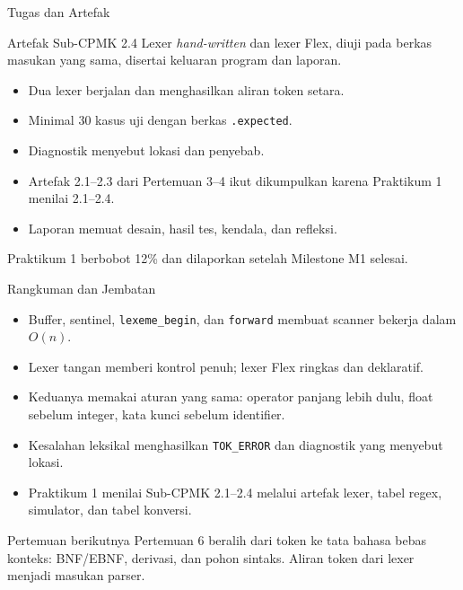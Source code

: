 \documentclass[aspectratio=169,10pt,t]{beamer}
\begin{document}
\begin{frame}{Tugas dan Artefak}
  \begin{block}{Artefak Sub-CPMK 2.4}
    Lexer \textit{hand-written} dan lexer Flex, diuji pada berkas
    masukan yang sama, disertai keluaran program dan laporan.
  \end{block}

  \small
  \begin{itemize}
    \item Dua lexer berjalan dan menghasilkan aliran token setara.
    \item Minimal 30 kasus uji dengan berkas \texttt{.expected}.
    \item Diagnostik menyebut lokasi dan penyebab.
    \item Artefak 2.1--2.3 dari Pertemuan 3--4 ikut dikumpulkan karena
          Praktikum 1 menilai 2.1--2.4.
    \item Laporan memuat desain, hasil tes, kendala, dan refleksi.
  \end{itemize}

  \vspace{3pt}
  {\footnotesize\color{ubbblue!75}Praktikum 1 berbobot 12\% dan
  dilaporkan setelah Milestone M1 selesai.}
\end{frame}

\begin{frame}{Rangkuman dan Jembatan}
  \begin{itemize}
    \item Buffer, sentinel, \texttt{lexeme\_begin}, dan \texttt{forward}
          membuat scanner bekerja dalam \(O(n)\).
    \item Lexer tangan memberi kontrol penuh; lexer Flex ringkas dan
          deklaratif.
    \item Keduanya memakai aturan yang sama: operator panjang lebih
          dulu, float sebelum integer, kata kunci sebelum identifier.
    \item Kesalahan leksikal menghasilkan \texttt{TOK\_ERROR} dan
          diagnostik yang menyebut lokasi.
    \item Praktikum 1 menilai Sub-CPMK 2.1--2.4 melalui artefak lexer,
          tabel regex, simulator, dan tabel konversi.
  \end{itemize}

  \vspace{4pt}
  \begin{exampleblock}{Pertemuan berikutnya}
    Pertemuan 6 beralih dari token ke tata bahasa bebas konteks:
    BNF/EBNF, derivasi, dan pohon sintaks. Aliran token dari lexer
    menjadi masukan parser.
  \end{exampleblock}
\end{frame}
\end{document}
